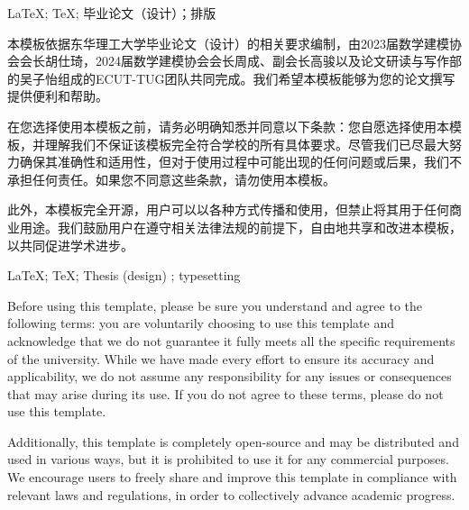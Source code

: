 \pagestyle {empty}
\begin{cnabstract}{\LaTeX ; \TeX ; 毕业论文（设计）；排版 } %

本模板依据东华理工大学毕业论文（设计）的相关要求编制，由2023届数学建模协会会长胡仕琦，2024届数学建模协会会长周成、副会长高骏以及论文研读与写作部的吴子怡组成的ECUT-TUG团队共同完成。我们希望本模板能够为您的论文撰写提供便利和帮助。

在您选择使用本模板之前，请务必明确知悉并同意以下条款：您自愿选择使用本模板，并理解我们不保证该模板完全符合学校的所有具体要求。尽管我们已尽最大努力确保其准确性和适用性，但对于使用过程中可能出现的任何问题或后果，我们不承担任何责任。如果您不同意这些条款，请勿使用本模板。

此外，本模板完全开源，用户可以以各种方式传播和使用，但禁止将其用于任何商业用途。我们鼓励用户在遵守相关法律法规的前提下，自由地共享和改进本模板，以共同促进学术进步。



\end{cnabstract}
\begin{enabstract}{\LaTeX; \TeX ; Thesis (design) ;  typesetting}%


Before using this template, please be sure you understand and agree to the following terms: you are voluntarily choosing to use this template and acknowledge that we do not guarantee it fully meets all the specific requirements of the university. While we have made every effort to ensure its accuracy and applicability, we do not assume any responsibility for any issues or consequences that may arise during its use. If you do not agree to these terms, please do not use this template.

Additionally, this template is completely open-source and may be distributed and used in various ways, but it is prohibited to use it for any commercial purposes. We encourage users to freely share and improve this template in compliance with relevant laws and regulations, in order to collectively advance academic progress.

\end{enabstract}
